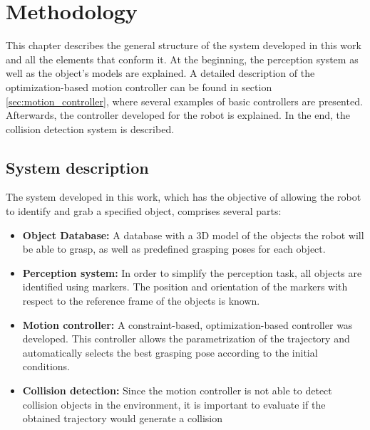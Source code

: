 
\chapter{\textbf{Methodology}}

This chapter describes the general structure of the system developed in this work and all the elements that conform it. At the beginning, the perception system as well as the object's models are explained. A detailed description of the optimization-based motion controller can be found in section \ref{sec:motion_controller}, where several examples of basic controllers are presented. Afterwards, the controller developed for the robot is explained. In the end, the collision detection system is described.

\section{System description}
\label{sec:sys_description}

The system developed in this work, which has the objective of allowing the robot to identify and grab a specified object, comprises several parts:

\begin{itemize}
	\item \textbf{Object Database:} A database with a 3D model of the objects the robot will be able to grasp, as well as predefined grasping poses for each object.
	\item \textbf{Perception system:} In order to simplify the perception task, all objects are identified using markers. The position and orientation of the markers with respect to the reference frame of the objects is known.
	\item \textbf{Motion controller:} A constraint-based, optimization-based controller was developed. This controller allows the parametrization of the trajectory and automatically selects the best grasping pose according to the initial conditions.
	\item \textbf{Collision detection:} Since the motion controller is not able to detect collision objects in the environment, it is important to evaluate if the obtained trajectory would generate a collision
\end{itemize} 

